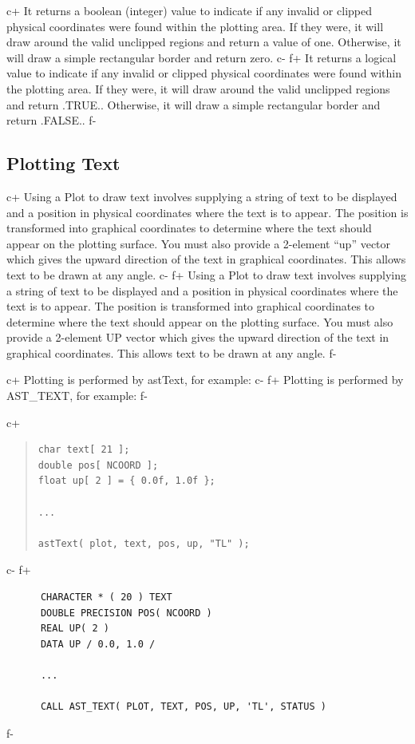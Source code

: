 \documentclass[twoside,11pt]{article}
\begin{document}
c+
It returns a boolean (integer) value to indicate if any invalid or
clipped physical coordinates were found within the plotting area. If
they were, it will draw around the valid unclipped regions and return
a value of one.  Otherwise, it will draw a simple rectangular border
and return zero.
c-
f+
It returns a logical value to indicate if any invalid or clipped
physical coordinates were found within the plotting area. If they
were, it will draw around the valid unclipped regions and return
.TRUE.. Otherwise, it will draw a simple rectangular border and return
.FALSE..
f-

\subsection{Plotting Text}

c+
Using a Plot to draw text involves supplying a string of text to be
displayed and a position in physical coordinates where the text is to
appear. The position is transformed into graphical coordinates to
determine where the text should appear on the plotting surface. You
must also provide a 2-element ``up'' vector which gives the upward
direction of the text in graphical coordinates. This allows text to be
drawn at any angle.
c-
f+
Using a Plot to draw text involves supplying a string of text to be
displayed and a position in physical coordinates where the text is to
appear. The position is transformed into graphical coordinates to
determine where the text should appear on the plotting surface. You
must also provide a 2-element UP vector which gives the upward
direction of the text in graphical coordinates. This allows text to be
drawn at any angle.
f-

c+
Plotting is performed by astText, for example:
c-
f+
Plotting is performed by AST\_TEXT, for example:
f-

c+
\begin{quote}
\small
\begin{verbatim}
char text[ 21 ];
double pos[ NCOORD ];
float up[ 2 ] = { 0.0f, 1.0f };

...

astText( plot, text, pos, up, "TL" );
\end{verbatim}
\normalsize
\end{quote}
c-
f+
\small
\begin{verbatim}
      CHARACTER * ( 20 ) TEXT
      DOUBLE PRECISION POS( NCOORD )
      REAL UP( 2 )
      DATA UP / 0.0, 1.0 /

      ...

      CALL AST_TEXT( PLOT, TEXT, POS, UP, 'TL', STATUS )
\end{verbatim}
\normalsize
f-
\end{document}
